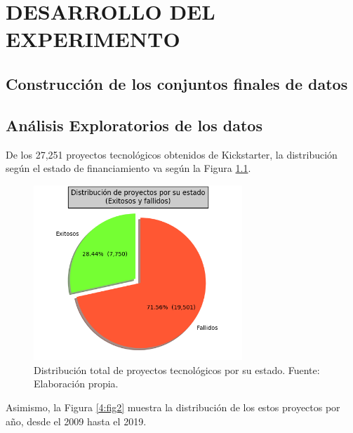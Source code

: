 \chapter{DESARROLLO DEL EXPERIMENTO}
\section{Construcción de los conjuntos finales de datos}

\section{Análisis Exploratorios de los datos}
De los 27,251 proyectos tecnológicos obtenidos de Kickstarter, la distribución según el estado de financiamiento va según la Figura \ref{4:fig1}.
\begin{figure}[h]
	\begin{center}
		\includegraphics[width=0.7\textwidth]{4/figures/projects by state.png}
		\caption{Distribución total de proyectos tecnológicos por su estado. Fuente: Elaboración propia.}
		\label{4:fig1}
	\end{center}
\end{figure}


Asimismo, la Figura \ref{4:fig2} muestra la distribución de los estos proyectos por año, desde el 2009 hasta el 2019.


